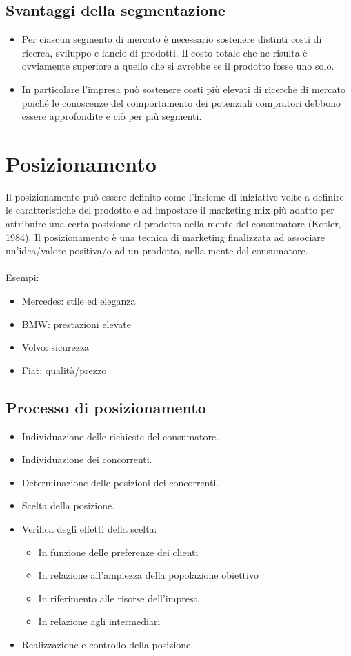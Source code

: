 \subsection{Svantaggi della segmentazione}
\begin{itemize}
	\item Per ciascun segmento di mercato è necessario sostenere distinti costi di ricerca, sviluppo e lancio di
	prodotti. Il costo totale che ne risulta è ovviamente superiore a quello che si avrebbe se il prodotto fosse
	uno solo.
	\item In particolare l’impresa può sostenere costi più
    elevati di ricerche di mercato poiché le conoscenze
	del comportamento dei potenziali compratori debbono
	essere approfondite e ciò per più segmenti.
\end{itemize}

\section{Posizionamento}
Il posizionamento può essere definito come l’insieme di iniziative volte a definire le caratteristiche del prodotto e ad impostare il marketing mix più adatto per attribuire una certa posizione al prodotto nella mente del consumatore (Kotler, 1984).
Il posizionamento è una tecnica di marketing finalizzata ad associare un’idea/valore positiva/o ad un prodotto, nella mente del consumatore.
\\
\\
{\Large Esempi:}
\begin{itemize}
	\item Mercedes: stile ed eleganza
	\item BMW: prestazioni elevate
	\item Volvo: sicurezza
	\item Fiat: qualità/prezzo
\end{itemize}
	
\subsection{Processo di posizionamento}
\begin{itemize}
	\item Individuazione delle richieste del consumatore.
	\item Individuazione dei concorrenti.
	\item Determinazione delle posizioni dei concorrenti.
	\item Scelta della posizione.
	\item Verifica degli effetti della scelta:
	\begin{itemize}
		\item In funzione delle preferenze dei clienti
		\item In relazione all’ampiezza della popolazione obiettivo
		\item In riferimento alle risorse dell’impresa
		\item In relazione agli intermediari
	\end{itemize}
	\item Realizzazione e controllo della posizione.
\end{itemize}

